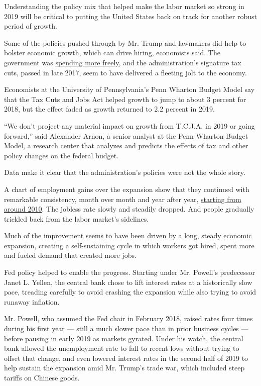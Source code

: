 Understanding the policy mix that helped make the labor market so strong
in 2019 will be critical to putting the United States back on track for
another robust period of growth.

Some of the policies pushed through by Mr. Trump and lawmakers did help
to bolster economic growth, which can drive hiring, economists said. The
government was
\href{https://fred.stlouisfed.org/series/W068RCQ027SBEA\#0}{spending
more freely}, and the administration's signature tax cuts, passed in
late 2017, seem to have delivered a fleeting jolt to the economy.

Economists at the University of Pennsylvania's Penn Wharton Budget Model
say that the Tax Cuts and Jobs Act helped growth to jump to about 3
percent for 2018, but the effect faded as growth returned to 2.2 percent
in 2019.

``We don't project any material impact on growth from T.C.J.A. in 2019
or going forward,'' said Alexander Arnon, a senior analyst at the Penn
Wharton Budget Model, a research center that analyzes and predicts the
effects of tax and other policy changes on the federal budget.

Data make it clear that the administration's policies were not the whole
story.

A chart of employment gains over the expansion show that they continued
with remarkable consistency, month over month and year after year,
\href{https://fred.stlouisfed.org/series/PAYEMS\#0}{starting from around
2010}. The jobless rate slowly and steadily dropped. And people
gradually trickled back from the labor market's sidelines.

Much of the improvement seems to have been driven by a long, steady
economic expansion, creating a self-sustaining cycle in which workers
got hired, spent more and fueled demand that created more jobs.

Fed policy helped to enable the progress. Starting under Mr. Powell's
predecessor Janet L. Yellen, the central bank chose to lift interest
rates at a historically slow pace, treading carefully to avoid crashing
the expansion while also trying to avoid runaway inflation.

Mr. Powell, who assumed the Fed chair in February 2018, raised rates
four times during his first year --- still a much slower pace than in
prior business cycles --- before pausing in early 2019 as markets
gyrated. Under his watch, the central bank allowed the unemployment rate
to fall to recent lows without trying to offset that change, and even
lowered interest rates in the second half of 2019 to help sustain the
expansion amid Mr. Trump's trade war, which included steep tariffs on
Chinese goods.

